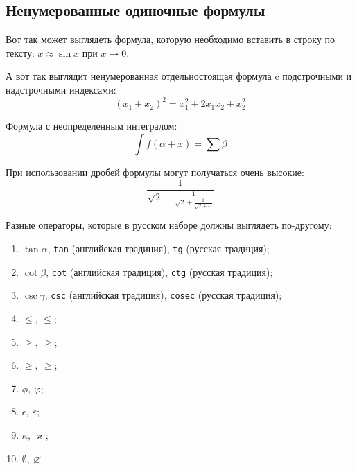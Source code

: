\documentclass[14pt]{cmcmsuthesis-bachelor}
\begin{document}
\subsection{Ненумерованные одиночные формулы}
\label{subsec:ch1/sec3/sub1}
Вот так может выглядеть формула, которую необходимо вставить в строку по тексту: \(x \approx \sin x\) при \(x \to 0\).

А вот так выглядит ненумерованная отдельностоящая формула c подстрочными и надстрочными индексами:
\[(x_1+x_2)^2 = x_1^2 + 2 x_1 x_2 + x_2^2\]

Формула с неопределенным интегралом:
\[\int f(\alpha+x)=\sum\beta\]

При использовании дробей формулы могут получаться очень высокие:
\[\frac{1}{\sqrt{2}+
        \displaystyle\frac{1}{\sqrt{2}+
            \displaystyle\frac{1}{\sqrt{2}+\cdots}}}\]

Разные операторы, которые в русском наборе должны выглядеть по-другому:
\begin{enumerate}
\item \(\tan\alpha\), \texttt{tan} (английская традиция), \texttt{tg} (русская традиция);
\item \(\cot\beta\), \texttt{cot} (английская традиция), \texttt{ctg} (русская традиция);
\item \(\csc\gamma\), \texttt{csc} (английская традиция), \texttt{cosec} (русская традиция);
\item \(\le\), \(\leqslant\);
\item \(\ge,\ \geqslant\);
\item \(\geq,\ \geqslant\);
\item \(\phi,\ \varphi\);
\item \(\epsilon,\ \varepsilon\);
\item \(\kappa,\ \varkappa\);
\item \(\emptyset,\ \varnothing\)
\end{enumerate}
\end{document}
